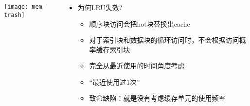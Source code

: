\begin{frame}[plain]
	\frametitle{ }
	\begin{columns}
		\begin{column}{.5\textwidth}
			\centering
			\texttt{[image: mem-trash]}
		\end{column}
		
		\begin{column}{.5\textwidth}
			
			\begin{itemize}
				\item 为何LRU失效?
				\begin{itemize}
					
					\item 顺序块访问会把hot块替换出cache
					\item 对于索引块和数据块的循环访问时，不会根据访问概率缓存索引块
					
					\pause
					
					\item 完全从最近使用的时间角度考虑
					\item “最近使用过1次”
					\item 致命缺陷：就是没有考虑缓存单元的使用频率
				\end{itemize}
			\end{itemize}
			
			
		\end{column}
		
		
	\end{columns}
\end{frame}

